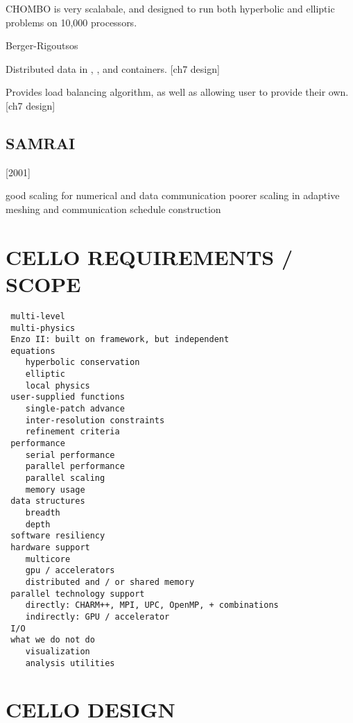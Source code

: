 \documentclass[14pt,letter]{article}
\begin{document}
CHOMBO is very scalabale, and designed to run both hyperbolic and
elliptic problems on 10,000 processors.

Berger-Rigoutsos 


Distributed data in , , and 
 containers. [ch7 design]

Provides load balancing algorithm, as well as allowing user to provide their own.
[ch7 design]


\subsection{SAMRAI}

[2001]


good scaling for numerical and data communication
poorer scaling in adaptive meshing and communication schedule construction 


\section{CELLO REQUIREMENTS / SCOPE} \label{s:requirements}

\begin{verbatim}
 multi-level
 multi-physics
 Enzo II: built on framework, but independent
 equations
    hyperbolic conservation
    elliptic
    local physics
 user-supplied functions
    single-patch advance
    inter-resolution constraints
    refinement criteria
 performance
    serial performance
    parallel performance
    parallel scaling
    memory usage
 data structures
    breadth
    depth
 software resiliency
 hardware support
    multicore
    gpu / accelerators
    distributed and / or shared memory
 parallel technology support
    directly: CHARM++, MPI, UPC, OpenMP, + combinations
    indirectly: GPU / accelerator
 I/O
 what we do not do
    visualization
    analysis utilities
\end{verbatim}

\section{CELLO DESIGN} \label{s:design}
\end{document}
